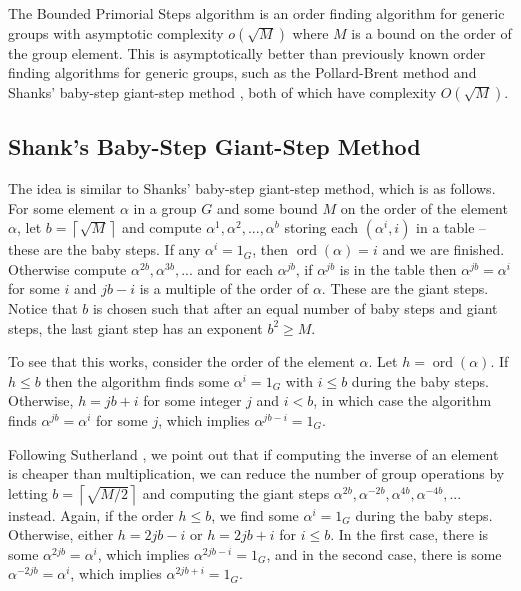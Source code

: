 \documentclass{ucalgthes1}
\theoremstyle{definition}
\DeclareMathOperator{\ord}{ord}
\newcommand{\ceil}[1]{\left\lceil #1 \right\rceil}
\begin{document}

The Bounded Primorial Steps algorithm \cite{Sutherland2007} is an order finding algorithm for generic groups with asymptotic complexity $o(\sqrt M)$ where $M$ is a bound on the order of the group element.  This is asymptotically better than previously known order finding algorithms for generic groups, such as the Pollard-Brent method \cite{Brent1980} and Shanks' baby-step giant-step method \cite{Shanks1971}, both of which have complexity $O(\sqrt M)$.

\subsection{Shank's Baby-Step Giant-Step Method}

The idea is similar to Shanks' baby-step giant-step method, which is as follows.  For some element $\alpha$ in a group $G$ and some bound $M$ on the order of the element $\alpha$, let $b = \ceil{\sqrt{M}}$ and compute $\alpha^1, \alpha^2, ..., \alpha^b$ storing each $(\alpha^i, i)$ in a table -- these are the baby steps.  If any $\alpha^i = 1_G$, then $\ord(\alpha) = i$ and we are finished.  Otherwise compute $\alpha^{2b}, \alpha^{3b}, ...$ and for each $\alpha^{jb}$, if $\alpha^{jb}$ is in the table then $\alpha^{jb} = \alpha^i$ for some $i$ and $jb - i$ is a multiple of the order of $\alpha$.  These are the giant steps.  Notice that $b$ is chosen such that after an equal number of baby steps and giant steps, the last giant step has an exponent $b^2 \ge M$.

To see that this works, consider the order of the element $\alpha$.  Let $h = \ord(\alpha)$.  If $h \le b$ then the algorithm finds some $\alpha^i = 1_G$ with $i \le b$ during the baby steps.  Otherwise, $h = jb + i$ for some integer $j$ and $i < b$, in which case the algorithm finds $\alpha^{jb} = \alpha^i$ for some $j$, which implies $\alpha^{jb-i} = 1_G$.

Following Sutherland \cite[p.50]{Sutherland2007}, we point out that if computing the inverse of an element is cheaper than multiplication, we can reduce the number of group operations by letting $b = \ceil{\sqrt{M/2}}$ and computing the giant steps $\alpha^{2b}, \alpha^{-2b}, \alpha^{4b}, \alpha^{-4b}, ...$ instead.  Again, if the order $h \le b$, we find some $\alpha^i = 1_G$ during the baby steps.  Otherwise, either $h = 2jb - i$ or $h = 2jb + i$ for $i \le b$.  In the first case, there is some $\alpha^{2jb} = \alpha^i$, which implies $\alpha^{2jb-i} = 1_G$, and in the second case, there is some $\alpha^{-2jb} = \alpha^i$, which implies $\alpha^{2jb+i} = 1_G$. 
\end{document}
